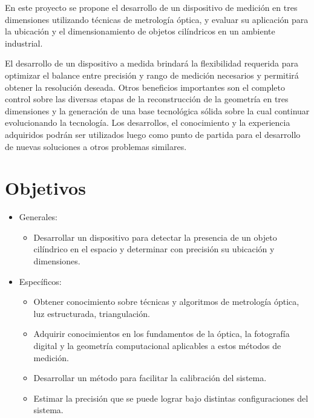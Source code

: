 En este proyecto se propone el desarrollo de un dispositivo de medición en tres dimensiones utilizando técnicas de metrología óptica, y evaluar su aplicación para la ubicación y el dimensionamiento de objetos cilíndricos en un ambiente industrial.

El desarrollo de un dispositivo a medida brindará la flexibilidad requerida para optimizar el balance entre precisión y rango de medición necesarios y permitirá obtener la resolución deseada. Otros beneficios importantes son el completo control sobre las diversas etapas de la reconstrucción de la geometría en tres dimensiones y la generación de una base tecnológica sólida sobre la cual continuar evolucionando la tecnología. Los desarrollos, el conocimiento y la experiencia adquiridos podrán ser utilizados luego como punto de partida para el desarrollo de nuevas soluciones a otros problemas similares.


\section{Objetivos}
\begin{itemize}
	\item Generales:
		\begin{itemize}
			\item Desarrollar un dispositivo para detectar la presencia de un 
			objeto cilíndrico en el espacio y determinar con precisión su 
			ubicación y dimensiones.
		\end{itemize}
	\item Específicos:
		\begin{itemize}
			\item Obtener conocimiento sobre técnicas y algoritmos de metrología
			 óptica, luz estructurada, triangulación.
			\item Adquirir conocimientos en los fundamentos de la óptica, la 
			fotografía digital y la geometría computacional aplicables a estos 
			métodos de medición.
			\item Desarrollar un método para facilitar la calibración del sistema.
			\item Estimar la precisión que se puede lograr bajo distintas 
			configuraciones del sistema.
		\end{itemize}
\end{itemize}

